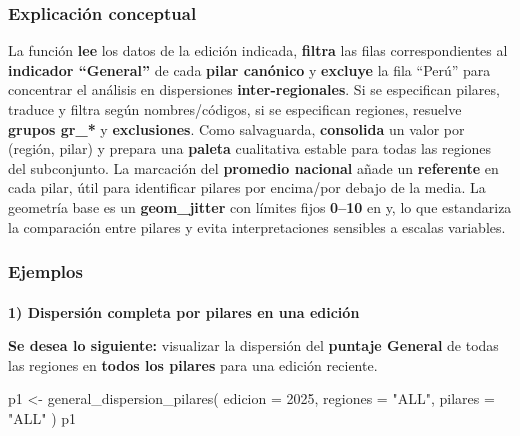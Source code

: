 \documentclass[
  11pt,
  letterpaper,
  DIV=11,
  numbers=noendperiod]{scrartcl}
\makeatletter
\let\oldparagraph\paragraph
\renewcommand{\paragraph}{
    \@ifstar
      \xxxParagraphStar
      \xxxParagraphNoStar
  }
\newcommand{\xxxParagraphStar}[1]{\oldparagraph*{#1}\mbox{}}
\newcommand{\xxxParagraphNoStar}[1]{\oldparagraph{#1}\mbox{}}
\newenvironment{Shaded}{\begin{snugshade}}{\end{snugshade}}
\newcommand{\AttributeTok}[1]{\textcolor[rgb]{0.40,0.45,0.13}{#1}}
\newcommand{\DecValTok}[1]{\textcolor[rgb]{0.68,0.00,0.00}{#1}}
\newcommand{\FunctionTok}[1]{\textcolor[rgb]{0.28,0.35,0.67}{#1}}
\newcommand{\NormalTok}[1]{\textcolor[rgb]{0.00,0.23,0.31}{#1}}
\newcommand{\OtherTok}[1]{\textcolor[rgb]{0.00,0.23,0.31}{#1}}
\newcommand{\StringTok}[1]{\textcolor[rgb]{0.13,0.47,0.30}{#1}}
\makeatother
\begin{document}
\subsubsection{\texorpdfstring{\textbf{Explicación
conceptual}}{Explicación conceptual}}\label{explicaciuxf3n-conceptual-2}

La función \textbf{lee} los datos de la edición indicada,
\textbf{filtra} las filas correspondientes al \textbf{indicador
``General''} de cada \textbf{pilar canónico} y \textbf{excluye} la fila
``Perú'' para concentrar el análisis en dispersiones
\textbf{inter-regionales}. Si se especifican pilares, traduce y filtra
según nombres/códigos, si se especifican regiones, resuelve
\textbf{grupos gr\_*} y \textbf{exclusiones}. Como salvaguarda,
\textbf{consolida} un valor por (región, pilar) y prepara una
\textbf{paleta} cualitativa estable para todas las regiones del
subconjunto. La marcación del \textbf{promedio nacional} añade un
\textbf{referente} en cada pilar, útil para identificar pilares por
encima/por debajo de la media. La geometría base es un
\textbf{geom\_jitter} con límites fijos \textbf{0--10} en y, lo que
estandariza la comparación entre pilares y evita interpretaciones
sensibles a escalas variables.

\subsubsection{\texorpdfstring{\textbf{Ejemplos}}{Ejemplos}}\label{ejemplos-2}

\paragraph{\texorpdfstring{\textbf{1) Dispersión completa por pilares en
una
edición}}{1) Dispersión completa por pilares en una edición}}\label{dispersiuxf3n-completa-por-pilares-en-una-ediciuxf3n}

\textbf{Se desea lo siguiente:} visualizar la dispersión del
\textbf{puntaje General} de todas las regiones en \textbf{todos los
pilares} para una edición reciente.

\begin{Shaded}
\begin{Highlighting}[]
\NormalTok{p1 }\OtherTok{\textless{}{-}} \FunctionTok{general\_dispersion\_pilares}\NormalTok{(}
  \AttributeTok{edicion =} \DecValTok{2025}\NormalTok{,}
  \AttributeTok{regiones =} \StringTok{"ALL"}\NormalTok{,}
  \AttributeTok{pilares  =} \StringTok{"ALL"}
\NormalTok{)}
\NormalTok{p1}
\end{Highlighting}
\end{Shaded}
\end{document}
